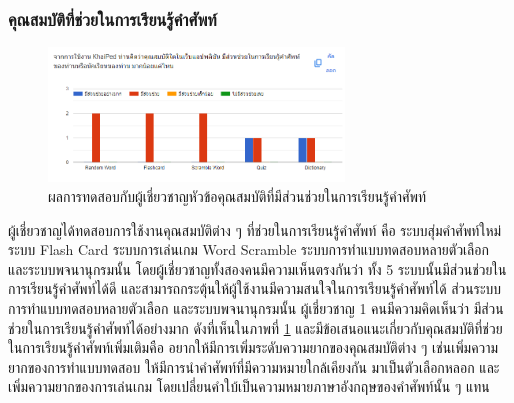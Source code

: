\documentclass[12pt,oneside,openright,a4paper]{cpe-thai-project}
\begin{document}
\subsubsection{คุณสมบัติที่ช่วยในการเรียนรู้คำศัพท์}
\begin{figure}[!h]\centering
	\includegraphics[width=0.7\textwidth, keepaspectratio=true]{image/chap4/Improve/feat.png}
	\caption{{ผลการทดสอบกับผู้เชี่ยวชาญหัวข้อคุณสมบัติที่มีส่วนช่วยในการเรียนรู้คำศัพท์}}\label{fig:chap4Feature}
\end{figure}
\hspace{1cm}
ผู้เชี่ยวชาญได้ทดสอบการใช้งานคุณสมบัติต่าง ๆ ที่ช่วยในการเรียนรู้คำศัพท์ คือ ระบบสุ่มคำศัพท์ใหม่ ระบบ Flash Card ระบบการเล่นเกม Word Scramble
ระบบการทำแบบทดสอบหลายตัวเลือก และระบบพจนานุกรมนั้น โดยผู้เชี่ยวชาญทั้งสองคนมีความเห็นตรงกันว่า
ทั้ง 5 ระบบนั้นมีส่วนช่วยในการเรียนรู้คำศัพท์ได้ดี และสามารถกระตุ้นให้ผู้ใช้งานมีความสนใจในการเรียนรู้คำศัพท์ได้
ส่วนระบบการทำแบบทดสอบหลายตัวเลือก และระบบพจนานุกรมนั้น ผู้เชี่ยวชาญ 1 คนมีความคิดเห็นว่า
มีส่วนช่วยในการเรียนรู้คำศัพท์ได้อย่างมาก ดังที่เห็นในภาพที่ \ref{fig:chap4Feature} และมีข้อเสนอแนะเกี่ยวกับคุณสมบัติที่ช่วยในการเรียนรู้คำศัพท์เพิ่มเติมคือ
อยากให้มีการเพิ่มระดับความยากของคุณสมบัติต่าง ๆ เช่นเพิ่มความยากของการทำแบบทดสอบ ให้มีการนำคำศัพท์ที่มีความหมายใกล้เคียงกัน
มาเป็นตัวเลือกหลอก และเพิ่มความยากของการเล่นเกม โดยเปลี่ยนคำใบ้เป็นความหมายภาษาอังกฤษของคำศัพท์นั้น ๆ แทน

\pagebreak
\end{document}
